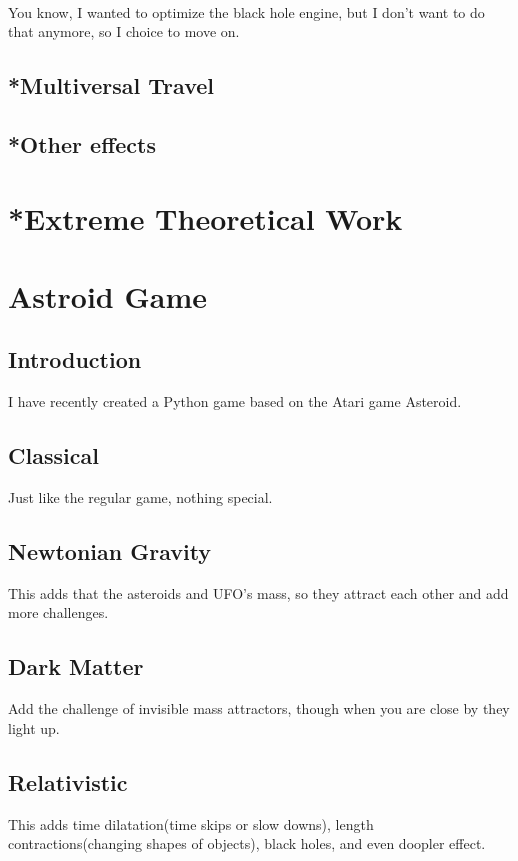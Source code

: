\\


\par You know, I wanted to optimize the black hole engine, but I don't want to do that anymore, so I choice to move on.

\subsection{*Multiversal Travel}
\subsection{*Other effects}
\section{*Extreme Theoretical Work}
\section{Astroid Game}
\subsection{Introduction}
\par I have recently created a Python game based on the Atari game Asteroid.
\subsection{Classical}
\par Just like the regular game, nothing special.
\subsection{Newtonian Gravity}
\par This adds that the asteroids and UFO's mass, so they attract each other and add more challenges.
\subsection{Dark Matter}
\par Add the challenge of invisible mass attractors, though when you are close by they light up.
\subsection{Relativistic}
\par This adds time dilatation(time skips or slow downs), length contractions(changing shapes of objects), black holes, and even doopler effect. 

